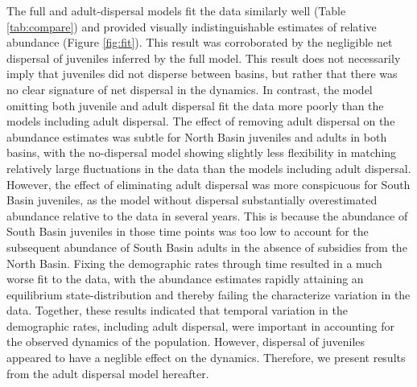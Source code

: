 \documentclass[11pt]{article}
\begin{document}
The full and adult-dispersal models fit the data similarly well (Table \ref{tab:compare})
and provided visually indistinguishable estimates of relative abundance (Figure \ref{fig:fit}). 
This result was corroborated by the negligible net dispersal of juveniles inferred by the full model.
This result does not necessarily imply that juveniles did not disperse between basins,
but rather that there was no clear signature of net dispersal in the dynamics.
In contrast, the model omitting both juvenile and adult dispersal fit
the data more poorly than the models including adult dispersal.
The effect of removing adult dispersal on the abundance estimates was subtle
for North Basin juveniles and adults in both basins,
with the no-dispersal model showing slightly less flexibility in matching 
relatively large fluctuations in the data than the models including adult dispersal.
However, 
the effect of eliminating adult dispersal was more conspicuous for South Basin juveniles,
as the model without dispersal substantially overestimated abundance relative to the data
in several years.
This is because the abundance of South Basin juveniles in those time points was too low 
to account for the subsequent abundance of South Basin adults 
in the absence of subsidies from the North Basin.
Fixing the demographic rates through time resulted in a much worse fit to the data,
with the abundance estimates rapidly attaining an equilibrium state-distribution
and thereby failing the characterize variation in the data.
Together, these results indicated that temporal variation in the demographic rates,
including adult dispersal, were important in accounting 
for the observed dynamics of the population.
However, dispersal of juveniles appeared to have a neglible effect on the dynamics.
Therefore, we present results from the adult dispersal model hereafter.
\end{document}
